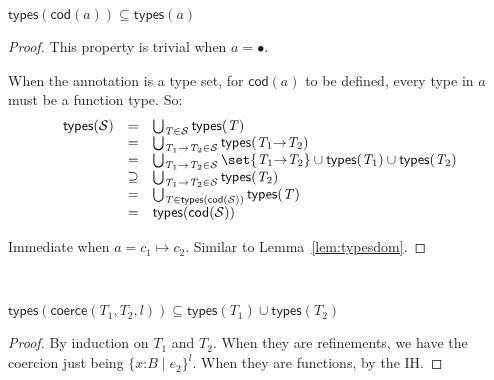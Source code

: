 \documentclass[9pt]{extarticle}
\newcommand{\ottnt}[1]{\mathit{#1}}
\newcommand{\ottsym}[1]{#1}
\begin{document}
\begin{lemma}
  \label{lem:typescod}
  $  \mathsf{types} (  \mathsf{cod} ( \ottnt{a} )  )   \subseteq   \mathsf{types} ( \ottnt{a} )  $
\begin{proof}
    {\iffull
    This property is trivial when $\ottnt{a}  \ottsym{=}  \bullet$.

    When the annotation is a type set, for $ \mathsf{cod} ( \ottnt{a} ) $ to be
    defined, every type in $\ottnt{a}$ must be a function type. So:
    \[ \begin{array}{rcl}
       \mathsf{types} ( \mathcal{S} )  &=& \bigcup_{ \ottnt{T}  \in  \mathcal{S} }  \mathsf{types} ( \ottnt{T} )  \\
      &=& \bigcup_{  \ottnt{T_{{\mathrm{1}}}} \mathord{ \rightarrow } \ottnt{T_{{\mathrm{2}}}}   \in  \mathcal{S} }  \mathsf{types} (  \ottnt{T_{{\mathrm{1}}}} \mathord{ \rightarrow } \ottnt{T_{{\mathrm{2}}}}  )  \\
      &=& \bigcup_{  \ottnt{T_{{\mathrm{1}}}} \mathord{ \rightarrow } \ottnt{T_{{\mathrm{2}}}}   \in  \mathcal{S} }    \set{   \ottnt{T_{{\mathrm{1}}}} \mathord{ \rightarrow } \ottnt{T_{{\mathrm{2}}}}   }   \cup   \mathsf{types} ( \ottnt{T_{{\mathrm{1}}}} )    \cup   \mathsf{types} ( \ottnt{T_{{\mathrm{2}}}} )   \\
      &\supseteq& \bigcup_{  \ottnt{T_{{\mathrm{1}}}} \mathord{ \rightarrow } \ottnt{T_{{\mathrm{2}}}}   \in  \mathcal{S} }  \mathsf{types} ( \ottnt{T_{{\mathrm{2}}}} )  \\
      &=& \bigcup_{ \ottnt{T}  \in   \mathsf{types} (  \mathsf{cod} ( \mathcal{S} )  )  }  \mathsf{types} ( \ottnt{T} )  \\
      &=&  \mathsf{types} (  \mathsf{cod} ( \mathcal{S} )  ) 
    \end{array} \]

    Immediate when $\ottnt{a}  \ottsym{=}  \ottnt{c_{{\mathrm{1}}}}  \mapsto  \ottnt{c_{{\mathrm{2}}}}$.
    \else
    Similar to Lemma~\ref{lem:typesdom}.
    \fi}
  \end{proof}
\end{lemma}

\begin{lemma}
  \label{lem:typescoerce}
  ~
  
  \noindent
  $  \mathsf{types} (  \mathsf{coerce} ( \ottnt{T_{{\mathrm{1}}}} , \ottnt{T_{{\mathrm{2}}}} , \ottnt{l} )  )   \subseteq    \mathsf{types} ( \ottnt{T_{{\mathrm{1}}}} )   \cup   \mathsf{types} ( \ottnt{T_{{\mathrm{2}}}} )   $
\begin{proof}
    By induction on $\ottnt{T_{{\mathrm{1}}}}$ and $\ottnt{T_{{\mathrm{2}}}}$.
When they are refinements, we have the coercion just being
    $ \{ \mathit{x} \mathord{:} \ottnt{B} \mathrel{\mid} \ottnt{e_{{\mathrm{2}}}} \}^{ \ottnt{l} } $. When they are functions, by the IH.
  \end{proof}
\end{lemma}
\end{document}
